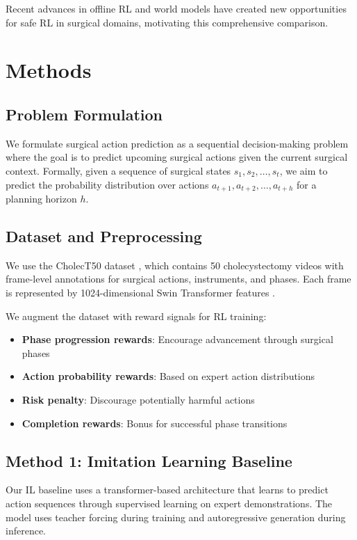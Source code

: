 \documentclass[conference]{IEEEtran}
\begin{document}
Recent advances in offline RL \cite{levine2020offline} and world models \cite{ha2018world} have created new opportunities for safe RL in surgical domains, motivating this comprehensive comparison.

\section{Methods}

\subsection{Problem Formulation}

We formulate surgical action prediction as a sequential decision-making problem where the goal is to predict upcoming surgical actions given the current surgical context. Formally, given a sequence of surgical states $s_1, s_2, \ldots, s_t$, we aim to predict the probability distribution over actions $a_{t+1}, a_{t+2}, \ldots, a_{t+h}$ for a planning horizon $h$.

\subsection{Dataset and Preprocessing}

We use the CholecT50 dataset \cite{nwoye2022cholect50}, which contains 50 cholecystectomy videos with frame-level annotations for surgical actions, instruments, and phases. Each frame is represented by 1024-dimensional Swin Transformer features \cite{liu2021swin}.

We augment the dataset with reward signals for RL training:
\begin{itemize}
\item \textbf{Phase progression rewards}: Encourage advancement through surgical phases
\item \textbf{Action probability rewards}: Based on expert action distributions
\item \textbf{Risk penalty}: Discourage potentially harmful actions
\item \textbf{Completion rewards}: Bonus for successful phase transitions
\end{itemize}

\subsection{Method 1: Imitation Learning Baseline}

Our IL baseline uses a transformer-based architecture that learns to predict action sequences through supervised learning on expert demonstrations. The model uses teacher forcing during training and autoregressive generation during inference.
\end{document}
